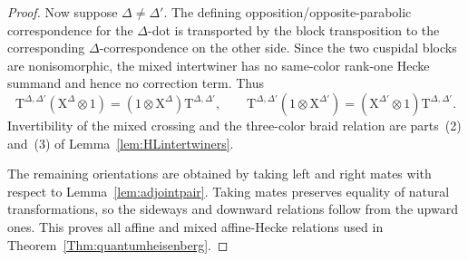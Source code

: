 \documentclass[12pt]{amsart}
\numberwithin{itemcounter}{subsection}
\theoremstyle{plain}
\theoremstyle{definition}
\theoremstyle{remark}
\numberwithin{equation}{section}
\begin{document}
\begin{proof}
Now suppose \(\Delta\ne\Delta'\).  The defining opposition/opposite-parabolic
correspondence for the $\Delta$-dot is transported by the block transposition
to the corresponding $\Delta$-correspondence on the other side.  Since the
two cuspidal blocks are nonisomorphic, the mixed intertwiner has no
same-color rank-one Hecke summand and hence no correction term.  Thus
\[
\mathrm{T}^{\Delta,\Delta'}(\mathrm{X}^\Delta\otimes1)
=(1\otimes \mathrm{X}^\Delta)\mathrm{T}^{\Delta,\Delta'},
\qquad
\mathrm{T}^{\Delta,\Delta'}(1\otimes \mathrm{X}^{\Delta'})
=(\mathrm{X}^{\Delta'}\otimes1)\mathrm{T}^{\Delta,\Delta'}.
\]
Invertibility of the mixed crossing and the three-color braid relation are
parts~(2) and~(3) of Lemma~\ref{lem:HLintertwiners}.

The remaining orientations are obtained by taking left and right mates with
respect to Lemma~\ref{lem:adjointpair}.  Taking mates preserves equality of
natural transformations, so the sideways and downward relations follow from
the upward ones.  This proves all affine and mixed affine-Hecke relations used
in Theorem~\ref{Thm:quantumheisenberg}.
\end{proof}

\smallskip
\end{document}
